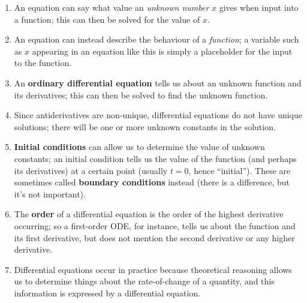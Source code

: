 \documentclass{article}
\begin{document}
\begin{enumerate}
	\item An equation can say what value an \textit{unknown number} $x$ gives when input into a function; this can then be solved for the value of $x$.
	\item An equation can instead describe the behaviour of a \textit{function}; a variable such as $x$ appearing in an equation like this is simply a placeholder for the input to the function.
	\item An \textbf{ordinary differential equation} tells us about an unknown function and its derivatives; this can then be solved to find the unknown function.
	\item Since antiderivatives are non-unique, differential equations do not have unique solutions; there will be one or more unknown constants in the solution.
	\item \textbf{Initial conditions} can allow us to determine the value of unknown constants; an initial condition tells us the value of the function (and perhaps its derivatives) at a certain point (usually $t=0$, hence ``initial''). These are sometimes called \textbf{boundary conditions} instead (there is a difference, but it's not important).
	\item The \textbf{order} of a differential equation is the order of the highest derivative occurring; so a first-order ODE, for instance, tells us about the function and its first derivative, but does not mention the second derivative or any higher derivative.
	\item Differential equations occur in practice because theoretical reasoning allows us to determine things about the rate-of-change of a quantity, and this information is expressed by a differential equation.
\end{enumerate}
\end{document}
